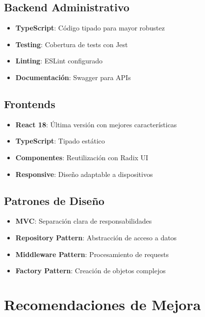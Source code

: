 \documentclass[12pt,a4paper]{article}
\begin{document}
\subsection{Backend Administrativo}
\begin{itemize}
    \item \textbf{TypeScript}: Código tipado para mayor robustez
    \item \textbf{Testing}: Cobertura de tests con Jest
    \item \textbf{Linting}: ESLint configurado
    \item \textbf{Documentación}: Swagger para APIs
\end{itemize}

\subsection{Frontends}
\begin{itemize}
    \item \textbf{React 18}: Última versión con mejores características
    \item \textbf{TypeScript}: Tipado estático
    \item \textbf{Componentes}: Reutilización con Radix UI
    \item \textbf{Responsive}: Diseño adaptable a dispositivos
\end{itemize}

\subsection{Patrones de Diseño}
\begin{itemize}
    \item \textbf{MVC}: Separación clara de responsabilidades
    \item \textbf{Repository Pattern}: Abstracción de acceso a datos
    \item \textbf{Middleware Pattern}: Procesamiento de requests
    \item \textbf{Factory Pattern}: Creación de objetos complejos
\end{itemize}

\section{Recomendaciones de Mejora}
\end{document}
